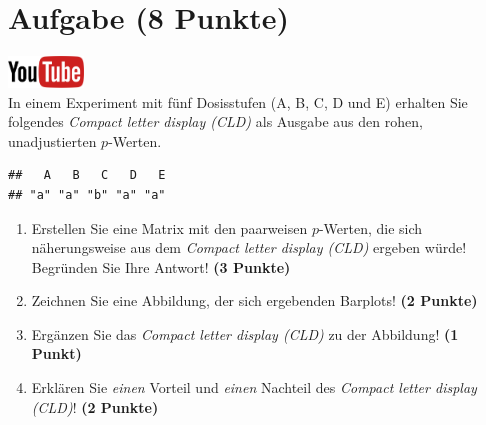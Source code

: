 \documentclass[a4paper, 10pt]{scrartcl}\usepackage[]{graphicx}\usepackage[]{xcolor}
\makeatletter
\newenvironment{kframe}{%
 \def\at@end@of@kframe{}%
 \ifinner\ifhmode%
  \def\at@end@of@kframe{\end{minipage}}%
  \begin{minipage}{\columnwidth}%
 \fi\fi%
 \def\FrameCommand##1{\hskip\@totalleftmargin \hskip-\fboxsep
 \colorbox{shadecolor}{##1}\hskip-\fboxsep
     \hskip-\linewidth \hskip-\@totalleftmargin \hskip\columnwidth}%
 \MakeFramed {\advance\hsize-\width
   \@totalleftmargin\z@ \linewidth\hsize
   \@setminipage}}%
 {\par\unskip\endMakeFramed%
 \at@end@of@kframe}
\newenvironment{knitrout}{}{} %
\makeatother
\begin{document}
 
\clearpage

\section{Aufgabe \hfill (8 Punkte)}


 \hfill\href{https://youtu.be/xq29O8qDrg0}{\includegraphics[width =
   2cm]{img/youtube}}\\[1Ex]


In einem Experiment mit f{\"u}nf Dosisstufen (A, B, C, D und E) erhalten Sie
folgendes \textit{Compact letter display (CLD)} als \Rlogo Ausgabe aus den rohen, unadjustierten $p$-Werten. 



\begin{knitrout}
\color{fgcolor}\begin{kframe}
\begin{verbatim}
##   A   B   C   D   E 
## "a" "a" "b" "a" "a"
\end{verbatim}
\end{kframe}
\end{knitrout}

\begin{enumerate}
\item Erstellen Sie eine Matrix mit den paarweisen $p$-Werten, die sich
  n{\"a}herungsweise aus dem \textit{Compact letter display (CLD)} ergeben w{\"u}rde! Begr{\"u}nden Sie Ihre Antwort! \textbf{(3 Punkte)}
\item Zeichnen Sie eine Abbildung, der sich ergebenden Barplots! \textbf{(2 Punkte)}
\item Erg{\"a}nzen Sie das \textit{Compact letter display (CLD)} zu der
  Abbildung! \textbf{(1 Punkt)}
\item Erkl{\"a}ren Sie \textit{einen} Vorteil und \textit{einen} Nachteil des \textit{Compact letter display (CLD)}! \textbf{(2 Punkte)}
\end{enumerate}
\end{document}
